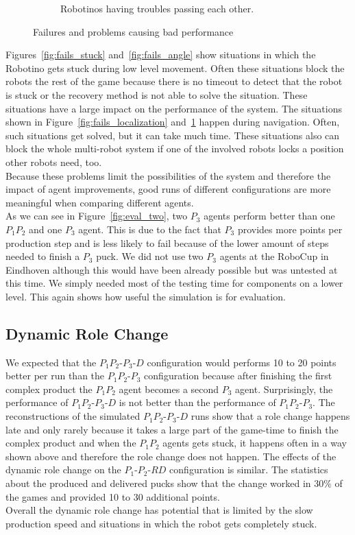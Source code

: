 \begin{figure}
\begin{subfigure}[b]{0.38\textwidth}
    \caption{Robotinos having troubles passing each other.}
    \label{fig:fails_passing}
  \end{subfigure}
  \caption{Failures and problems causing bad performance}
  \label{fig:fails}
\end{figure}
Figures~\ref{fig:fails_stuck} and~\ref{fig:fails_angle} show situations in which the Robotino gets stuck during low level movement. Often these situations block the robots the rest of the game because there is no timeout to detect that the robot is stuck or the recovery method is not able to solve the situation. These situations have a large impact on the performance of the system. The situations shown in Figure~\ref{fig:fails_localization} and~\ref{fig:fails_passing} happen during navigation. Often, such situations get solved, but it can take much time. These situations also can block the whole multi-robot system if one of the involved robots locks a position other robots need, too.\\
Because these problems limit the possibilities of the system and therefore the impact of agent improvements, good runs of different configurations are more meaningful when comparing different agents.\\
As we can see in Figure~\ref{fig:eval_two}, two $P_3$ agents perform better than one $P_1P_2$ and one $P_3$ agent. This is due to the fact that $P_3$ provides more points per production step and is less likely to fail because of the lower amount of steps needed to finish a $P_3$ puck. We did not use two $P_3$ agents at the RoboCup in Eindhoven although this would have been already possible but was untested at this time. We simply needed most of the testing time for components on a lower level. This again shows how useful the simulation is for evaluation.

\subsection{Dynamic Role Change}
We expected that the $P_1P_2$-$P_3$-$D$ configuration would performs 10 to 20 points better per run than the $P_1P_2$-$P_3$ configuration because after finishing the first complex product the $P_1P_2$ agent becomes a second $P_3$ agent. Surprisingly, the performance of $P_1P_2$-$P_3$-$D$ is not better than the performance of $P_1P_2$-$P_3$. The reconstructions of the simulated $P_1P_2$-$P_3$-$D$ runs show that a role change happens late and only rarely because it takes a large part of the game-time to finish the complex product and when the $P_1P_2$ agents gets stuck, it happens often in a way shown above and therefore the role change does not happen. The effects of the dynamic role change on the $P_1$-$P_2$-$RD$ configuration is similar. The statistics about the produced and delivered pucks show that the change worked in $30\%$ of the games and provided 10 to 30 additional points.\\
Overall the dynamic role change has potential that is limited by the slow production speed and situations in which the robot gets completely stuck.

